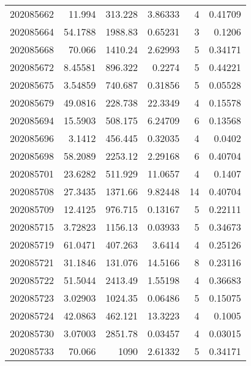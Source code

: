 \begin{tabular}{rrrrrr}
 202085662 &         11.994   &      313.228  &            3.86333 &           4 & 0.41709 \\
 202085664 &         54.1788  &     1988.83   &            0.65231 &           3 & 0.1206  \\
 202085668 &         70.066   &     1410.24   &            2.62993 &           5 & 0.34171 \\
 202085672 &          8.45581 &      896.322  &            0.2274  &           5 & 0.44221 \\
 202085675 &          3.54859 &      740.687  &            0.31856 &           5 & 0.05528 \\
 202085679 &         49.0816  &      228.738  &           22.3349  &           4 & 0.15578 \\
 202085694 &         15.5903  &      508.175  &            6.24709 &           6 & 0.13568 \\
 202085696 &          3.1412  &      456.445  &            0.32035 &           4 & 0.0402  \\
 202085698 &         58.2089  &     2253.12   &            2.29168 &           6 & 0.40704 \\
 202085701 &         23.6282  &      511.929  &           11.0657  &           4 & 0.1407  \\
 202085708 &         27.3435  &     1371.66   &            9.82448 &          14 & 0.40704 \\
 202085709 &         12.4125  &      976.715  &            0.13167 &           5 & 0.22111 \\
 202085715 &          3.72823 &     1156.13   &            0.03933 &           5 & 0.34673 \\
 202085719 &         61.0471  &      407.263  &            3.6414  &           4 & 0.25126 \\
 202085721 &         31.1846  &      131.076  &           14.5166  &           8 & 0.23116 \\
 202085722 &         51.5044  &     2413.49   &            1.55198 &           4 & 0.36683 \\
 202085723 &          3.02903 &     1024.35   &            0.06486 &           5 & 0.15075 \\
 202085724 &         42.0863  &      462.121  &           13.3223  &           4 & 0.1005  \\
 202085730 &          3.07003 &     2851.78   &            0.03457 &           4 & 0.03015 \\
 202085733 &         70.066   &     1090      &            2.61332 &           5 & 0.34171 \\

\end{tabular}
